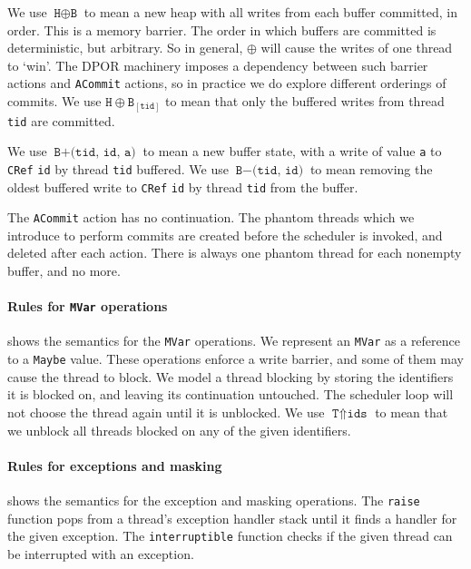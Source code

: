 We use $\texttt{H} \oplus \texttt{B}$ to mean a new heap with all
writes from each buffer committed, in order.  This is a memory
barrier.  The order in which buffers are committed is deterministic,
but arbitrary.  So in general, $\oplus$ will cause the writes of one
thread to `win'.  The DPOR machinery imposes a dependency between such
barrier actions and \verb|ACommit| actions, so in practice we do
explore different orderings of commits.  We use
$\texttt{H} \oplus \texttt{B}_{[\texttt{tid}]}$ to mean that only the
buffered writes from thread \verb|tid| are committed.

We use $\texttt{B} + \texttt{(tid, id, a)}$ to mean a new buffer
state, with a write of value \verb|a| to \verb|CRef| \verb|id| by
thread \verb|tid| buffered.  We use $\texttt{B} - \texttt{(tid, id)}$
to mean removing the oldest buffered write to \verb|CRef| \verb|id| by
thread \verb|tid| from the buffer.

The \verb|ACommit| action has no continuation.  The phantom threads
which we introduce to perform commits are created before the scheduler
is invoked, and deleted after each action.  There is always one
phantom thread for each nonempty buffer, and no more.

\paragraph{Rules for \texttt{MVar} operations}
 shows the semantics for the \verb|MVar|
operations.  We represent an \verb|MVar| as a reference to a
\verb|Maybe| value.  These operations enforce a write barrier, and
some of them may cause the thread to block.  We model a thread
blocking by storing the identifiers it is blocked on, and leaving its
continuation untouched.  The scheduler loop will not choose the thread
again until it is unblocked.  We use
$\texttt{T} \Uparrow \texttt{ids}$ to mean that we unblock all threads
blocked on any of the given identifiers.

\paragraph{Rules for exceptions and masking}
 shows the semantics for the exception and masking
operations.  The \verb|raise| function pops from a thread's exception
handler stack until it finds a handler for the given exception.  The
\verb|interruptible| function checks if the given thread can be
interrupted with an exception.

